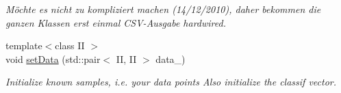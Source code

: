 \begin{DoxyCompactItemize}
\begin{DoxyCompactList}\small\item\em Möchte es nicht zu kompliziert machen (14/12/2010), daher bekommen die ganzen Klassen erst einmal CSV-\/Ausgabe hardwired. \item\end{DoxyCompactList}\item 
\hypertarget{classCDA_1_1EM_a8f779d18072975dc994bd4370f19a238}{
{\footnotesize template$<$class II $>$ }\\void \hyperlink{classCDA_1_1EM_a8f779d18072975dc994bd4370f19a238}{setData} (std::pair$<$ II, II $>$ data\_\-)}
\label{classCDA_1_1EM_a8f779d18072975dc994bd4370f19a238}

\begin{DoxyCompactList}\small\item\em Initialize known samples, i.e. your data points Also initialize the classif vector. \item\end{DoxyCompactList}\end{DoxyCompactItemize}
